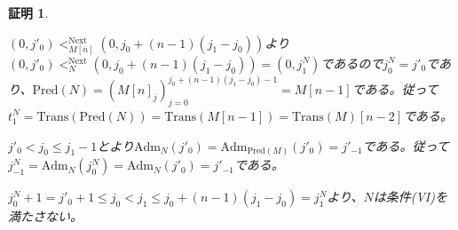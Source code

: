 \documentclass[dvipdfmx,uplatex]{jsarticle}
\newif\iffull
\theoremstyle{customnonumberbreakfortheorem}
\theoremstyle{customnonumberbreakforproof}
\newtheorem{hideableproof}{証明}
\begin{document}
\begin{hideableproof}
\begin{indented}
		\item \((0,j'_0) <_{M[n]}^{\textrm{Next}} (0,j_0+(n-1)(j_1-j_0))\)より\((0,j'_0) <_N^{\textrm{Next}} (0,j_0+(n-1)(j_1-j_0)) = (0,j_1^N)\)であるので\(j_0^N = j'_0\)であり、\(\textrm{Pred}(N) = (M[n]_j)_{j=0}^{j_0+(n-1)(j_1-j_0)-1} = M[n-1]\)である。従って\(t_1^N = \textrm{Trans}(\textrm{Pred}(N)) = \textrm{Trans}(M[n-1]) = \textrm{Trans}(M)[n-2]\)である。
		\item \(j'_0 < j_0 \leq j_1-1\)とより\(\textrm{Adm}_N(j'_0) = \textrm{Adm}_{\textrm{Pred}(M)}(j'_0) = j'_{-1}\)である。従って\(j_{-1}^N = \textrm{Adm}_N(j_0^N) = \textrm{Adm}_N(j'_0) = j'_{-1}\)である。
		\item \(j_0^N+1 = j'_0+1 \leq j_0 < j_1 \leq j_0+(n-1)(j_1-j_0) = j_1^N\)より、\(N\)は条件(VI)を満たさない。
	\end{indented}
\end{hideableproof}

\iffull{それでは本題に戻る。}\fi
\end{document}
